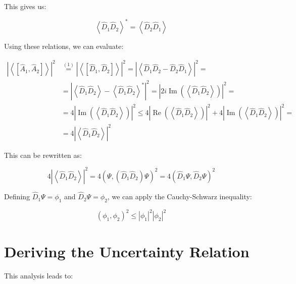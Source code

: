 This gives us:

\begin{equation}
\left\langle\hat{D}_{1} \hat{D}_{2}\right\rangle^{*}=\left\langle\hat{D}_{2} \hat{D}_{1}\right\rangle
\end{equation}

Using these relations, we can evaluate:

\begin{align}
\left|\left\langle\left[\hat{A}_{1}, \hat{A}_{2}\right]\right\rangle\right|^{2} & \stackrel{(1)}{=}\left|\left\langle\left[\hat{D}_{1}, \hat{D}_{2}\right]\right\rangle\right|^{2}=\left|\left\langle\hat{D}_{1} \hat{D}_{2}-\hat{D}_{2} \hat{D}_{1}\right\rangle\right|^{2}= \\
& =\left|\left\langle\hat{D}_{1} \hat{D}_{2}\right\rangle-\left\langle\hat{D}_{1} \hat{D}_{2}\right\rangle^{*}\right|^{2}=\left|2 i \operatorname{Im}\left(\left\langle\hat{D}_{1} \hat{D}_{2}\right\rangle\right)\right|^{2}= \\
& =4\left|\operatorname{Im}\left(\left\langle\hat{D}_{1} \hat{D}_{2}\right\rangle\right)\right|^{2} \leq 4\left|\operatorname{Re}\left(\left\langle\hat{D}_{1} \hat{D}_{2}\right\rangle\right)\right|^{2}+4\left|\operatorname{Im}\left(\left\langle\hat{D}_{1} \hat{D}_{2}\right\rangle\right)\right|^{2}= \\
& =4\left|\left\langle\hat{D}_{1} \hat{D}_{2}\right\rangle\right|^{2}
\end{align}

This can be rewritten as:

\begin{equation}
4\left|\left\langle\hat{D}_{1} \hat{D}_{2}\right\rangle\right|^{2}=4\left(\Psi,\left(\hat{D}_{1} \hat{D}_{2}\right) \Psi\right)^{2}=4\left(\hat{D}_{1} \Psi, \hat{D}_{2} \Psi\right)^{2}
\end{equation}

Defining $\hat{D}_{1} \Psi=\phi_{1}$ and $\hat{D}_{2} \Psi=\phi_{2}$, we can apply the Cauchy-Schwarz inequality:

\begin{equation}
\left(\phi_{1}, \phi_{2}\right)^{2} \leq\left|\phi_{1}\right|^2\left|\phi_{2}\right|^2
\end{equation}


\section{Deriving the Uncertainty Relation}
This analysis leads to:

